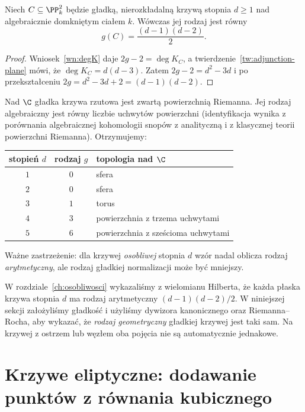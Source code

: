 \begin{twierdzenie}
\label{tw:plane-genus}
Niech $C\subseteq\PP^2_k$ będzie gładką,
nierozkładalną krzywą stopnia $d\ge1$
nad algebraicznie domkniętym ciałem $k$.
Wówczas jej rodzaj jest równy
\[
 g(C)=\frac{(d-1)(d-2)}2.
\]
\end{twierdzenie}
\begin{proof}
Wniosek~\ref{wn:degK} daje $2g-2=\deg K_C$,
a twierdzenie~\ref{tw:adjunction-plane} mówi,
że $\deg K_C=d(d-3)$. Zatem
$2g-2=d^2-3d$ i po przekształceniu
$2g=d^2-3d+2=(d-1)(d-2)$.
\end{proof}

\begin{przyklad}
Nad $\C$ gładka krzywa rzutowa jest zwartą
powierzchnią Riemanna. Jej rodzaj algebraiczny
jest równy liczbie uchwytów powierzchni
(identyfikacja wynika z porównania algebraicznej
kohomologii snopów z analityczną i z klasycznej
teorii powierzchni Riemanna). Otrzymujemy:
\begin{center}
\begin{tabular}{c|c|l}
stopień $d$&rodzaj $g$&topologia nad $\C$\\\hline
$1$&$0$&sfera\\
$2$&$0$&sfera\\
$3$&$1$&torus\\
$4$&$3$&powierzchnia z trzema uchwytami\\
$5$&$6$&powierzchnia z sześcioma uchwytami
\end{tabular}
\end{center}
Ważne zastrzeżenie: dla krzywej \emph{osobliwej}
stopnia $d$ wzór nadal oblicza rodzaj \emph{arytmetyczny},
ale rodzaj gładkiej normalizacji może być mniejszy.
\end{przyklad}

\begin{uwaga}
W rozdziale~\ref{ch:osobliwosci} wykazaliśmy z
wielomianu Hilberta, że każda płaska krzywa
stopnia $d$ ma rodzaj arytmetyczny
$(d-1)(d-2)/2$. W niniejszej sekcji założyliśmy
gładkość i użyliśmy dywizora kanonicznego oraz
Riemanna--Rocha, aby wykazać, że \emph{rodzaj
geometryczny} gładkiej krzywej jest taki sam.
Na krzywej z ostrzem lub węzłem oba pojęcia
nie są automatycznie jednakowe.
\end{uwaga}

\section{Krzywe eliptyczne: dodawanie punktów z równania kubicznego}
\label{sec:elliptic}


